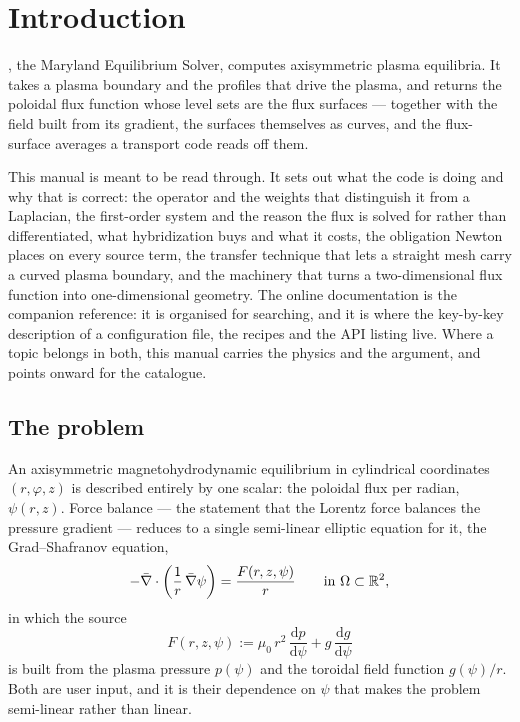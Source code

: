 \chapter{Introduction}
\label{ch:intro}

{\meq}, the Maryland Equilibrium Solver, computes axisymmetric plasma
equilibria. It takes a plasma boundary and the profiles that drive the plasma,
and returns the poloidal flux function whose level sets are the flux surfaces
--- together with the field built from its gradient, the surfaces themselves as
curves, and the flux-surface averages a transport code reads off them.

This manual is meant to be read through. It sets out what the code is doing and
why that is correct: the operator and the weights that distinguish it from a
Laplacian, the first-order system and the reason the flux is solved for rather
than differentiated, what hybridization buys and what it costs, the obligation
Newton places on every source term, the transfer technique that lets a straight
mesh carry a curved plasma boundary, and the machinery that turns a
two-dimensional flux function into one-dimensional geometry. The online
documentation is the companion reference: it is organised for searching, and it
is where the key-by-key description of a configuration file, the recipes and the
API listing live. Where a topic belongs in both, this manual carries the physics
and the argument, and points onward for the catalogue.

\section{The problem}

An axisymmetric magnetohydrodynamic equilibrium in cylindrical coordinates
$(r, \varphi, z)$ is described entirely by one scalar: the poloidal flux per
radian, $\psi(r,z)$. Force balance --- the statement that the Lorentz force
balances the pressure gradient --- reduces to a single semi-linear elliptic
equation for it, the Grad--Shafranov equation,
%
\begin{equation}
	-\bar{\nabla} \cdot \left( \frac{1}{r}\, \bar{\nabla} \psi \right)
		= \frac{F(r,z,\psi)}{r}
	\qquad \text{in } \Omega \subset \mathbb{R}^{2},
	\label{eq:gs}
\end{equation}
%
in which the source
%
\begin{equation}
	F(r,z,\psi) := \mu_{0}\, r^{2}\, \frac{\mathrm{d}p}{\mathrm{d}\psi}
		+ g\, \frac{\mathrm{d}g}{\mathrm{d}\psi}
	\label{eq:source}
\end{equation}
%
is built from the plasma pressure $p(\psi)$ and the toroidal field function
$g(\psi)/r$. Both are user input, and it is their dependence on $\psi$ that
makes the problem semi-linear rather than linear.

